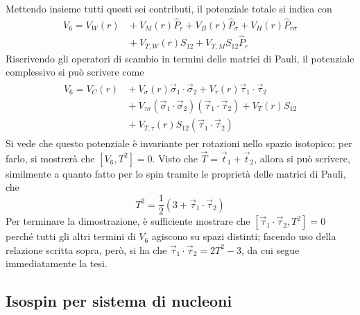 \documentclass[11pt, a4paper]{scrartcl}
\theoremstyle{style}
\numberwithin{equation}{subsection}
\begin{document}
\noindent Mettendo insieme tutti questi sei contributi, il potenziale totale si indica con
\begin{equation}
	\begin{split}
		V_6 = V_W(r) & { } + V_M(r) \hat{P}_r  + V_B (r) \hat{P}_\sigma + V_H (r) \hat{P}_{r\sigma } \\
						&{ } + V_{T,W}(r) S_{12} + V_{T,M}S_{12} \hat{P}_r
	\end{split}
\end{equation}
Riscrivendo gli operatori di scambio in termini delle matrici di Pauli, il potenziale complessivo si pu\`o scrivere come
\begin{equation}\label{v6}
	\begin{split}
		\begin{split}
		V_6 = V_C(r) & { } + V_\sigma (r) \vec{\sigma }_1\cdot \vec{\sigma }_2 + V_\tau (r) \vec{\tau }_1 \cdot \vec{\tau }_2\\
			     &{ } + V_{\tau \sigma} (\vec{\sigma }_1 \cdot \vec{\sigma }_2) (\vec{\tau } _1\cdot \vec{\tau }_2) + V_T(r) S_{12} \\
			     & { } + V_{T,\tau }(r) S_{12} (\vec{\tau }_1 \cdot \vec{\tau }_2)
		\end{split}
	\end{split}
\end{equation}
Si vede che questo potenziale \`e invariante per rotazioni nello spazio isotopico; per farlo, si mostrer\`a che $[V_6,T^2] = 0$.
Visto che $\vec{T} = \vec{t}_1 + \vec{t}_2$, allora si pu\`o scrivere, similmente a quanto fatto per lo spin tramite le propriet\`a delle matrici di Pauli, che
\[
	T^2 = \frac{1}{2} \left(3 + \vec{\tau }_1 \cdot \vec{\tau }_2\right) 
\] 
Per terminare la dimostrazione, \`e sufficiente mostrare che $[\vec{\tau }_1\cdot \vec{\tau }_2, T^2]=0$ perch\'e tutti gli altri termini di $V_6$ agiscono su spazi distinti; facendo uso della relazione scritta sopra, per\`o, si ha che $\vec{\tau }_1 \cdot \vec{\tau }_2 = 2 T^2 - 3$, da cui segue immediatamente la tesi.

\subsection{Isospin per sistema di nucleoni}
\end{document}
